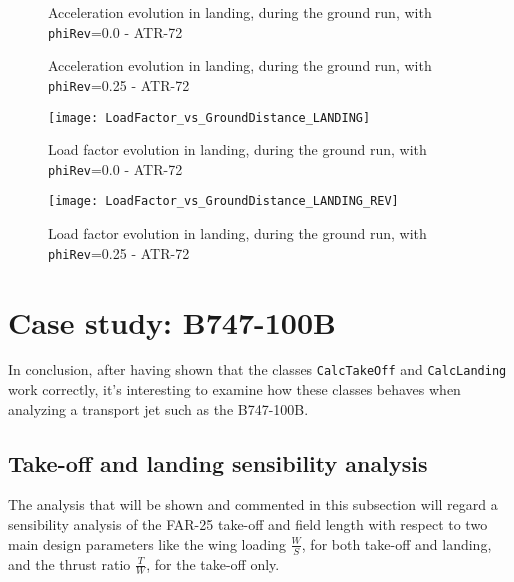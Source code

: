 %
\begin{figure}[!t]
\centering

\caption{Acceleration evolution in landing, during the ground run, with \lstinline[language=Java]!phiRev!=0.0 - ATR-72}
\end{figure}
%
\begin{figure}[!b]
\centering

\caption{Acceleration evolution in landing, during the ground run, with \lstinline[language=Java]!phiRev!=0.25 - ATR-72}
\end{figure}
%
\begin{figure}[!b]
\centering
\texttt{[image: LoadFactor\_vs\_GroundDistance\_LANDING]}
\caption{Load factor evolution in landing, during the ground run, with \lstinline[language=Java]!phiRev!=0.0 - ATR-72}
\end{figure}
%
\begin{figure}[!b]
\centering
\texttt{[image: LoadFactor\_vs\_GroundDistance\_LANDING\_REV]}
\caption{Load factor evolution in landing, during the ground run, with \lstinline[language=Java]!phiRev!=0.25 - ATR-72}
\label{fig:LandingEnd}
\end{figure}
%
%
\clearpage
%
\section{Case study: B747-100B}
%
In conclusion, after having shown that the classes \lstinline[language=Java]!CalcTakeOff! and \lstinline[language=Java]!CalcLanding! work correctly, it's interesting to examine how these classes behaves when analyzing a transport jet such as the B747-100B. 
%
\subsection{Take-off and landing sensibility analysis}
The analysis that will be shown and commented in this subsection will regard a sensibility analysis of the \gls{FAR}-25 take-off and field length with respect to two main design parameters like the wing loading $\frac{W}{S}$, for both take-off and landing, and the thrust ratio $\frac{T}{W}$, for the take-off only.

